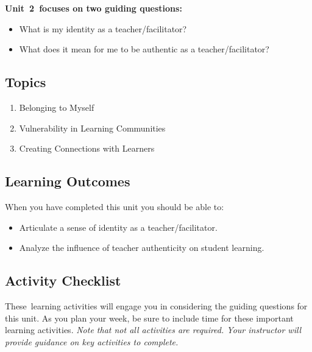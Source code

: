 \documentclass[
]{book}
\providecommand{\tightlist}{%
  \setlength{\itemsep}{0pt}\setlength{\parskip}{0pt}}
\begin{document}
\textbf{Unit~2~focuses on two guiding questions:}

\begin{itemize}
\tightlist
\item
  What is my identity as a teacher/facilitator?\\
\item
  What does it mean for me to be authentic as a teacher/facilitator?
\end{itemize}

\hypertarget{topics-1}{%
\subsection*{Topics}\label{topics-1}}

\begin{enumerate}
\def\labelenumi{\arabic{enumi}.}
\tightlist
\item
  Belonging to Myself\\
\item
  Vulnerability in Learning Communities\\
\item
  Creating Connections with Learners
\end{enumerate}

\hypertarget{learning-outcomes-1}{%
\subsection*{Learning Outcomes}\label{learning-outcomes-1}}

When you have completed this unit you should be able to:

\begin{itemize}
\tightlist
\item
  Articulate a sense of identity as a teacher/facilitator.\\
\item
  Analyze the influence of teacher authenticity on student learning.
\end{itemize}

\hypertarget{activity-checklist-1}{%
\subsection*{Activity Checklist}\label{activity-checklist-1}}

These~learning activities will engage you in considering the guiding questions for this unit. As you plan your week, be sure to include time for these important learning activities. \emph{Note that not all activities are required. Your instructor will provide guidance on key activities to complete.}
\end{document}

